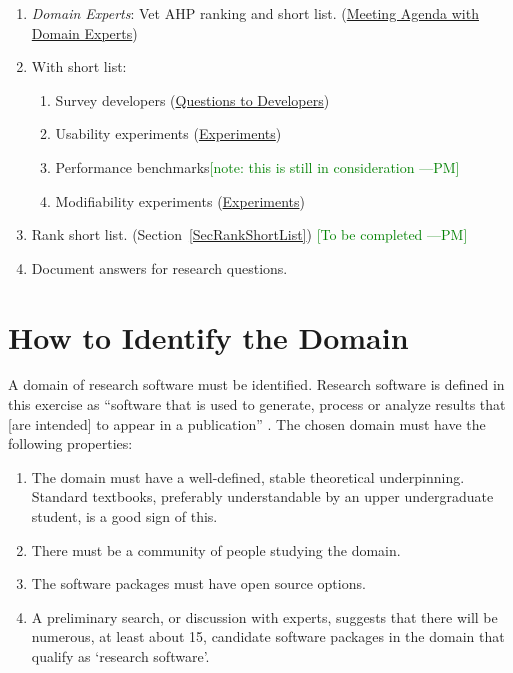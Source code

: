 \documentclass[letterpaper,cleveref]{lipics-v2019}
\newcommand{\authornote}[3]{\textcolor{#1}{[#3 ---#2]}}
\newcommand{\authornote}[3]{}
\newcommand{\wss}[1]{\authornote{blue}{SS}{#1}} %
\newcommand{\pmi}[1]{\authornote{green}{PM}{#1}} %
\theoremstyle{definition}
\begin{document}
\begin{enumerate}
\item \emph{Domain Experts}: Vet AHP ranking and short list. (\href{https://github.com/smiths/AIMSS/blob/master/StateOfPractice/Methodology/Meeting Agenda withmDomainmExperts.pdf}{Meeting Agenda with Domain Experts})
\item With short list:
\begin{enumerate}
\item Survey developers (\href{https://github.com/smiths/AIMSS/blob/master/StateOfPractice/Methodology/Questions to Developers.pdf}{Questions to Developers})
\item Usability experiments (\href{https://github.com/smiths/AIMSS/blob/master/StateOfPractice/Methodology/Experiments.pdf}{Experiments})
\item Performance benchmarks\pmi{note: this is still in consideration}
\item Modifiability experiments (\href{https://github.com/smiths/AIMSS/blob/master/StateOfPractice/Methodology/Experiments.pdf}{Experiments})
\end{enumerate}
\item Rank short list. (Section~\ref{SecRankShortList}) \pmi{To be completed}
\item Document answers for research questions.
\end{enumerate}


\section{How to Identify the Domain} \label{SecIdentifyDomain}
A domain of research software must be identified. Research software is defined in this exercise as ``software that is used to generate, process or analyze results that [are intended] to appear in a publication'' \citep{hettrick2014uk}. The chosen domain must have the following properties:

\begin{enumerate}	
	\item The domain must have a well-defined, stable theoretical underpinning. Standard textbooks, preferably understandable by an upper undergraduate student, is a good sign of this.
	\item There must be a community of people studying the domain.
	\item The software packages must have open source options. 
	\item A preliminary search, or discussion with experts, suggests that there will be numerous, at least about 15, candidate software packages in the domain that qualify as `research software'.
\end{enumerate}	
\end{document}
